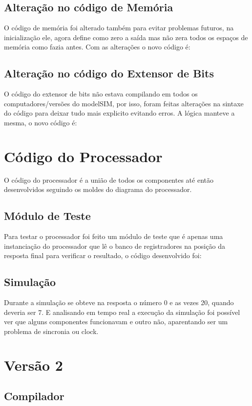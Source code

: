 \documentclass[a4paper, 10pt]{article}
\begin{document}
\subsection{Alteração no código de Memória}
O código de memória foi alterado também para evitar problemas futuros, na inicialização ele, agora define como zero a saída mas não zera todos os espaços de memória como fazia antes. Com as alterações o novo código é:

\subsection{Alteração no código do Extensor de Bits}
O código do extensor de bits não estava compilando em todos os computadores/versões do modelSIM, por isso, foram feitas alterações na sintaxe do código para deixar tudo mais explicito evitando erros. A lógica manteve a mesma, o novo código é:

\section{Código do Processador}
O código do processador é a união de todos os componentes até então desenvolvidos seguindo os moldes do diagrama do processador. 

\subsection{Módulo de Teste}
Para testar o processador foi feito um módulo de teste que é apenas uma instanciação do processador que lê o banco de registradores na posição da resposta final para verificar o resultado, o código desenvolvido foi:

\subsection{Simulação}
Durante a simulação se obteve na resposta o número 0 e as vezes 20, quando deveria ser 7. E analisando em tempo real a execução da simulação foi possível ver que alguns componentes funcionavam e outro não, aparentando ser um problema de sincronia ou clock.
\clearpage
\section{Versão 2}
\subsection{Compilador}

\end{document}
